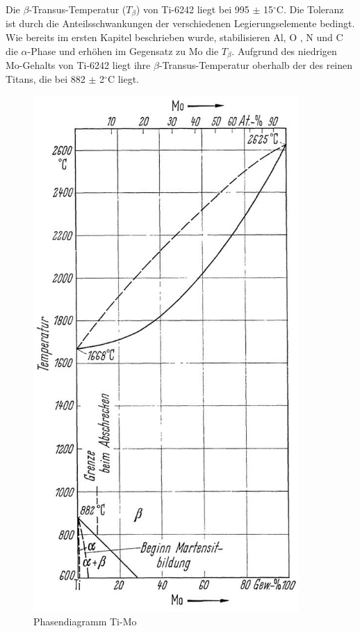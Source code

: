 	Die $\beta$-Transus-Temperatur ($T_{\beta}$) von Ti-6242 liegt bei 995 $\pm$ 15$^\circ$C. Die Toleranz ist durch die Anteilsschwankungen der verschiedenen Legierungselemente bedingt. Wie bereits im ersten Kapitel beschrieben wurde, stabilisieren  Al, O , N und C die $\alpha$-Phase und erhöhen im Gegensatz zu Mo die $T_{\beta}$.
	Aufgrund des niedrigen Mo-Gehalts von Ti-6242 liegt ihre $\beta$-Transus-Temperatur oberhalb der des reinen Titans, die bei 882 $\pm$ 2$^\circ$C liegt.
	

\begin{figure}[h]
		\centering
		\includegraphics[width= 0.9\textwidth, angle=90]{Bilder/TiMo}
		\caption{Phasendiagramm Ti-Mo \cite{Zwicker.2014}}
		\label{TiMo}
\end{figure}
	

